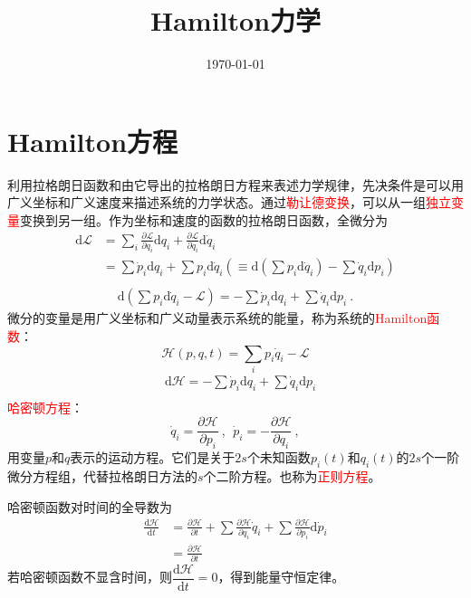 \documentclass[11pt,a4paper]{article}
\title{Hamilton力学}
\author{}
\date{\today}
\newcommand{\dif}{\mathrm{d}}
\begin{document}
\maketitle

\section{Hamilton方程}
\cite{2007理论物理学教程} 利用拉格朗日函数和由它导出的拉格朗日方程来表述力学规律，先决条件是可以用广义坐标和广义速度来描述系统的力学状态。通过\textcolor{red}{勒让德变换}，可以从一组\textcolor{red}{独立变量}变换到另一组。作为坐标和速度的函数的拉格朗日函数，全微分为
\begin{align*}
\dif \mathscr L &= \sum_i \frac{\partial \mathscr L}{\partial q_i} \dif q_i +\frac{\partial \mathscr L}{\partial \dot q_i} \dif \dot q_i \\
&=  \sum \dot p_i \dif q_i + \sum p_i \dif \dot q_i (\equiv \dif (\sum p_i \dif \dot q_i ) -\sum \dot q_i \dif p_i ) \\
\end{align*}
\begin{align*}
\dif (\sum p_i \dif \dot q_i -\mathscr L ) = -\sum \dot p_i \dif q_i + \sum \dot q_i \dif p_i ~.
\end{align*}
微分的变量是用广义坐标和广义动量表示系统的能量，称为系统的\textcolor{red}{Hamilton函数}：
\begin{equation}
\mathscr H (p,q,t) = \sum_i p_i \dot{q}_i - \mathscr L
\end{equation}
\begin{align}
& \dif \mathscr H = -\sum \dot p_i \dif q_i + \sum \dot q_i \dif p_i \\
\end{align}
\textcolor{red}{哈密顿方程}：
\begin{equation}
\dot q_i = \frac{\partial \mathscr H}{\partial p_i} ~, ~~\dot p_i = -\frac{\partial \mathscr H}{\partial q_i}  ~,
\end{equation}
用变量$p$和$q$表示的运动方程。它们是关于$2s$个未知函数$p_i(t)$和$q_i(t)$的$2s$个一阶微分方程组，代替拉格朗日方法的$s$个二阶方程。也称为\textcolor{red}{正则方程}。

哈密顿函数对时间的全导数为
\begin{align}
\frac{\dif \mathscr H}{\dif t} &= \frac{\partial \mathscr H}{\partial t} + \sum \frac{\partial \mathscr H}{\partial q_i} \dot q_i + \sum \frac{\partial \mathscr H}{\partial p_i} \dif \dot p_i \\
&= \frac{\partial \mathscr H}{\partial t} 
\end{align}
若哈密顿函数不显含时间，则$\dfrac{\dif \mathscr H}{\dif t} = 0$，得到能量守恒定律。
\end{document}
